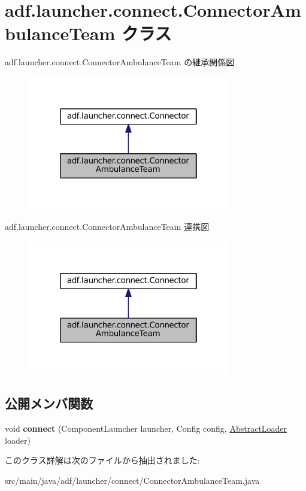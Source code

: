 \hypertarget{classadf_1_1launcher_1_1connect_1_1ConnectorAmbulanceTeam}{}\section{adf.\+launcher.\+connect.\+Connector\+Ambulance\+Team クラス}
\label{classadf_1_1launcher_1_1connect_1_1ConnectorAmbulanceTeam}


adf.\+launcher.\+connect.\+Connector\+Ambulance\+Team の継承関係図
\nopagebreak
\begin{figure}[H]
\begin{center}
\leavevmode
\includegraphics[width=250pt]{classadf_1_1launcher_1_1connect_1_1ConnectorAmbulanceTeam__inherit__graph}
\end{center}
\end{figure}


adf.\+launcher.\+connect.\+Connector\+Ambulance\+Team 連携図
\nopagebreak
\begin{figure}[H]
\begin{center}
\leavevmode
\includegraphics[width=250pt]{classadf_1_1launcher_1_1connect_1_1ConnectorAmbulanceTeam__coll__graph}
\end{center}
\end{figure}
\subsection*{公開メンバ関数}
\begin{DoxyCompactItemize}
\item 
\hypertarget{classadf_1_1launcher_1_1connect_1_1ConnectorAmbulanceTeam_ab8d91536ca43dc890644f58e8a8c45ef}{}\label{classadf_1_1launcher_1_1connect_1_1ConnectorAmbulanceTeam_ab8d91536ca43dc890644f58e8a8c45ef} 
void {\bfseries connect} (Component\+Launcher launcher, Config config, \hyperlink{classadf_1_1component_1_1AbstractLoader}{Abstract\+Loader} loader)
\end{DoxyCompactItemize}


このクラス詳解は次のファイルから抽出されました\+:\begin{DoxyCompactItemize}
\item 
src/main/java/adf/launcher/connect/Connector\+Ambulance\+Team.\+java\end{DoxyCompactItemize}
